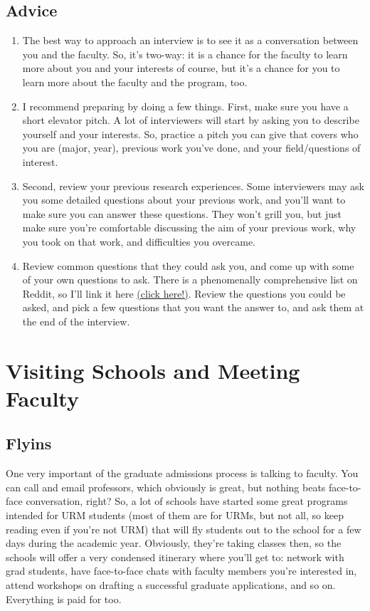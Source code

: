 \documentclass[12pt]{article}
\begin{document}
\subsection{Advice}
\begin{enumerate}
\item The best way to approach an interview is to see it as a conversation between you and the faculty. So, it's two-way: it is a chance for the faculty to learn more about you and your interests of course, but it's a chance for you to learn more about the faculty and the program, too.

\item I recommend preparing by doing a few things. First, make sure you have a short elevator pitch. A lot of interviewers will start by asking you to describe yourself and your interests. So, practice a pitch you can give that covers who you are (major, year), previous work you've done, and your field/questions of interest.

\item Second, review your previous research experiences. Some interviewers may ask you some detailed questions about your previous work, and you'll want to make sure you can answer these questions. They won't grill you, but just make sure you're comfortable discussing the aim of your previous work, why you took on that work, and difficulties you overcame.

\item Review common questions that they could ask you, and come up with some of your own questions to ask. There is a phenomenally comprehensive list on Reddit, so I'll link it here \href{https://www.reddit.com/r/gradadmissions/comments/a4vpc4/master_list_of_interview_questions/}{(click here!)}. Review the questions you could be asked, and pick a few questions that you want the answer to, and ask them at the end of the interview.
\end{enumerate}

\section{Visiting Schools and Meeting Faculty}
\subsection{Flyins}
One very important of the graduate admissions process is talking to faculty. You can call and email professors, which obviously is great, but nothing beats face-to-face conversation, right? So, a lot of schools have started some great programs intended for URM students (most of them are for URMs, but not all, so keep reading even if you're not URM) that will fly students out to the school for a few days during the academic year. Obviously, they're taking classes then, so the schools will offer a very condensed itinerary where you'll get to: network with grad students, have face-to-face chats with faculty members you're interested in, attend workshops on drafting a successful graduate applications, and so on. Everything is paid for too.
\end{document}
